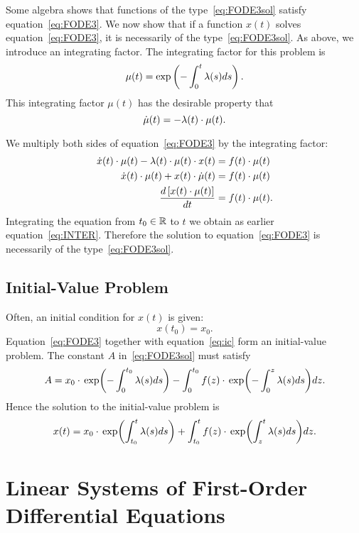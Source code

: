 \documentclass[letterpaper,12pt,leqno]{article}
\begin{document}
Some algebra shows that functions of the type~\eqref{eq:FODE3sol} satisfy equation~\eqref{eq:FODE3}. We now show that if a function $x(t)$ solves equation~\eqref{eq:FODE3}, it is necessarily of the type~\eqref{eq:FODE3sol}. As above, we introduce an integrating factor. The integrating factor for this problem is
\begin{equation*}
\mu(t) =\exp \bp{-\int_{0}^{t}\l(s) ds}.
\end{equation*}
This integrating factor $\mu(t)$ has the desirable property that 
\[\dot{\mu}(t) =-\lambda(t) \cdot \mu(t).\]

We multiply both sides of equation~\eqref{eq:FODE3} by the integrating factor:
\begin{align*}
\dot{x}(t) \cdot \mu(t) -\lambda(t) \cdot  \mu(t) \cdot x(t)& =f(t) \cdot \mu(t)\\
\dot{x}(t) \cdot\mu(t) +x(t) \cdot \dot{\mu}(t) &=f(t)\cdot \mu(t)\\
\frac{d \left[ x(t) \cdot \mu(t) \right]}{d t}& =f(t) \cdot\mu(t).
\end{align*}
Integrating the equation from $t_{0}\in \mathbb{R}$ to $t$ we obtain as earlier equation~\eqref{eq:INTER}. Therefore the solution to equation~\eqref{eq:FODE3} is necessarily of the type~\eqref{eq:FODE3sol}.

\subsection{Initial-Value Problem}

Often, an initial condition for $x(t) $ is given:
\begin{equation}
x(t_{0}) =x_{0}.  \label{eq:ic}
\end{equation}
Equation~\eqref{eq:FODE3} together with equation~\eqref{eq:ic} form an initial-value problem. The constant $A$ in~\eqref{eq:FODE3sol} must satisfy
\[A=x_{0}\cdot \exp{-\int_{0}^{t_{0}}\l(s)ds}-\int_{0}^{t_{0}}f(z) \cdot \exp{-\int_{0}^{z}\l(s)ds} dz.\]
Hence the solution to the initial-value problem is
\begin{equation}
x(t) =x_{0}\cdot \exp{\int_{t_{0}}^{t}\l(s)ds}+\int_{t_{0}}^{t}f(z)\cdot \exp{\int_{z}^{t}\l(s)ds}dz.\label{eq:icsol}
\end{equation}

\section{Linear Systems of First-Order Differential Equations}\label{sec:two}
\end{document}

